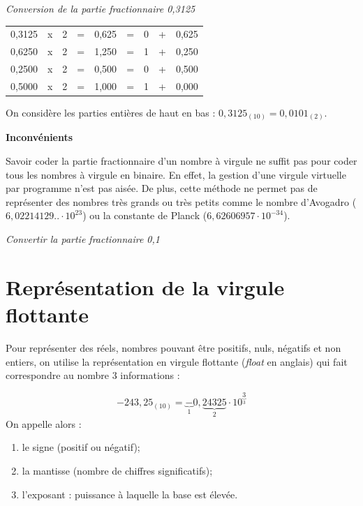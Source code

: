 \documentclass[10pt,fleqn]{article} %
\begin{document}
\begin{exemple}
\textit{Conversion de la partie fractionnaire 0,3125}

\begin{center}
\begin{tabular}{cccccc|c|cc}
\cline{7-7}
0,3125 & x & 2 & = & 0,625 & = & 0 & + & 0,625 \\
0,6250 & x & 2 & = & 1,250 & = & 1 & + & 0,250 \\
0,2500 & x & 2 & = & 0,500 & = & 0 & + & 0,500 \\
0,5000 & x & 2 & = & 1,000 & = & 1 & + & 0,000 \\
\cline{7-7}
\end{tabular}
\end{center}
On considère les parties entières de haut en bas :
$0,3125_{(10)}=0,0101_{(2)}$.
\end{exemple}

\begin{rem}
\textbf{Inconvénients}

Savoir coder la partie fractionnaire d’un nombre à virgule ne suffit pas pour coder tous les nombres à virgule en binaire. En effet, la gestion d’une virgule virtuelle par programme n’est pas aisée. De plus, cette méthode ne permet pas de représenter des nombres très grands ou très petits comme le nombre d’Avogadro ($6,02214129.. \cdot  10^{23}$) ou la constante de Planck ($6,62606957 \cdot 10^{- 34}$).
\end{rem}

\begin{exemple}
\textit{Convertir la partie fractionnaire 0,1}
\end{exemple}

\section{Représentation de la virgule flottante}

Pour représenter des réels, nombres pouvant être positifs, nuls, négatifs et non entiers, on utilise la représentation en virgule flottante (\textit{float} en anglais) qui fait correspondre au nombre 3 informations :

$$
-243,25_{(10)} = \underbrace{-}_{1}0,\underbrace{24325}_{2}\cdot10^{\underbrace{3}_{3}}
$$
On appelle alors : 
\begin{enumerate}
\item le signe (positif ou négatif);
\item la mantisse (nombre de chiffres significatifs);
\item l'exposant : puissance à laquelle la base est élevée. 
\end{enumerate}
\end{document}
